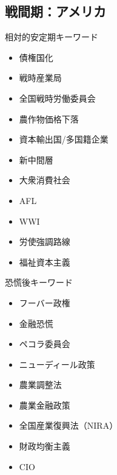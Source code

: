 \documentclass{jsarticle}
\begin{document}
\subsection{戦間期：アメリカ}
相対的安定期キーワード
\begin{itemize}
\item 債権国化
\item 戦時産業局
\item 全国戦時労働委員会
\item 農作物価格下落
\item 資本輸出国/多国籍企業
\item 新中間層
\item 大衆消費社会
\item AFL
\item WWI
\item 労使強調路線
\item 福祉資本主義
\end{itemize}
恐慌後キーワード
\begin{itemize}
\item フーバー政権
\item 金融恐慌
\item ペコラ委員会
\item ニューディール政策
\item 農業調整法
\item 農業金融政策
\item 全国産業復興法（NIRA）
\item 財政均衡主義
\item CIO
\end{itemize}
\end{document}
